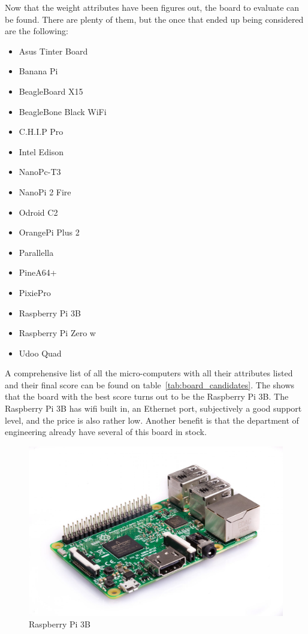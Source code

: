 Now that the weight attributes have been figures out, the board to evaluate can be found. There are plenty of them, but the once that ended up being considered are the following:
\begin{itemize}[itemsep=-1mm]
\item Asus Tinter Board \cite{asus-tinker-board}
\item Banana Pi \cite{banana-pi}
\item BeagleBoard X15 \cite{beagle-x15}
\item BeagleBone Black WiFi \cite{beagle-bone}
\item C.H.I.P Pro \cite{chip-pro}
\item Intel Edison \cite{intel-edison}
\item NanoPc-T3 \cite{nanopc}
\item NanoPi 2 Fire \cite{nanopi}
\item Odroid C2 \cite{odroid}
\item OrangePi Plus 2  \cite{orangepi}
\item Parallella \cite{parallella}
\item PineA64+ \cite{pinea64}
\item PixiePro \cite{pixiepro}
\item Raspberry Pi 3B \cite{rpi}
\item Raspberry Pi Zero w \cite{rpi}
\item Udoo Quad \cite{udoo-quad}
\end{itemize}

A comprehensive list of all the micro-computers with all their attributes listed and their final score can be found on table~\ref{tab:board_candidates}. The shows that the board with the best score turns out to be the Raspberry Pi 3B. The Raspberry Pi 3B has wifi built in, an Ethernet port, subjectively a good support level, and the price is also rather low. Another benefit is that the department of engineering already have several of this board in stock.

\begin{figure} [h]
\centering
\includegraphics[width=0.7\linewidth]{Images/Design/rpi3b}
\caption{Raspberry Pi 3B}
\label{fig:rpi3b}
\end{figure}

